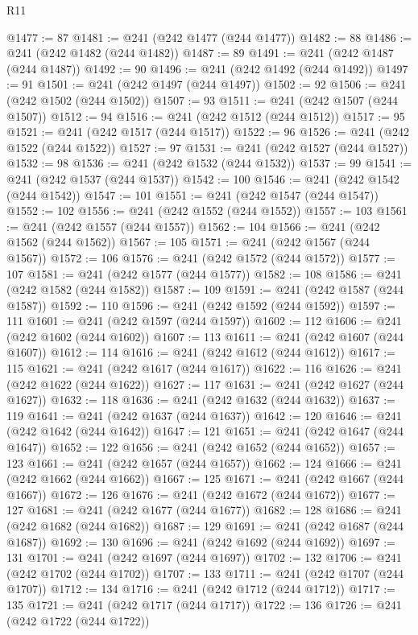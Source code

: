 \begin{lexlean}{R11}
\begin{coremodule}
{{{{{{{{{{{{{{{{{{{{{{{{{{{{{{{{{{{{{{{{{{{{{{{{{{{{{{{{{{{{{{{{{{{{{{{{{{{{{{{{{{{{{{{{{{{{{{{{{{{{{{{{{{@1477 := 87
@1481 := @241 (@242 @1477 (@244 @1477))
@1482 := 88
@1486 := @241 (@242 @1482 (@244 @1482))
@1487 := 89
@1491 := @241 (@242 @1487 (@244 @1487))
@1492 := 90
@1496 := @241 (@242 @1492 (@244 @1492))
@1497 := 91
@1501 := @241 (@242 @1497 (@244 @1497))
@1502 := 92
@1506 := @241 (@242 @1502 (@244 @1502))
@1507 := 93
@1511 := @241 (@242 @1507 (@244 @1507))
@1512 := 94
@1516 := @241 (@242 @1512 (@244 @1512))
@1517 := 95
@1521 := @241 (@242 @1517 (@244 @1517))
@1522 := 96
@1526 := @241 (@242 @1522 (@244 @1522))
@1527 := 97
@1531 := @241 (@242 @1527 (@244 @1527))
@1532 := 98
@1536 := @241 (@242 @1532 (@244 @1532))
@1537 := 99
@1541 := @241 (@242 @1537 (@244 @1537))
@1542 := 100
@1546 := @241 (@242 @1542 (@244 @1542))
@1547 := 101
@1551 := @241 (@242 @1547 (@244 @1547))
@1552 := 102
@1556 := @241 (@242 @1552 (@244 @1552))
@1557 := 103
@1561 := @241 (@242 @1557 (@244 @1557))
@1562 := 104
@1566 := @241 (@242 @1562 (@244 @1562))
@1567 := 105
@1571 := @241 (@242 @1567 (@244 @1567))
@1572 := 106
@1576 := @241 (@242 @1572 (@244 @1572))
@1577 := 107
@1581 := @241 (@242 @1577 (@244 @1577))
@1582 := 108
@1586 := @241 (@242 @1582 (@244 @1582))
@1587 := 109
@1591 := @241 (@242 @1587 (@244 @1587))
@1592 := 110
@1596 := @241 (@242 @1592 (@244 @1592))
@1597 := 111
@1601 := @241 (@242 @1597 (@244 @1597))
@1602 := 112
@1606 := @241 (@242 @1602 (@244 @1602))
@1607 := 113
@1611 := @241 (@242 @1607 (@244 @1607))
@1612 := 114
@1616 := @241 (@242 @1612 (@244 @1612))
@1617 := 115
@1621 := @241 (@242 @1617 (@244 @1617))
@1622 := 116
@1626 := @241 (@242 @1622 (@244 @1622))
@1627 := 117
@1631 := @241 (@242 @1627 (@244 @1627))
@1632 := 118
@1636 := @241 (@242 @1632 (@244 @1632))
@1637 := 119
@1641 := @241 (@242 @1637 (@244 @1637))
@1642 := 120
@1646 := @241 (@242 @1642 (@244 @1642))
@1647 := 121
@1651 := @241 (@242 @1647 (@244 @1647))
@1652 := 122
@1656 := @241 (@242 @1652 (@244 @1652))
@1657 := 123
@1661 := @241 (@242 @1657 (@244 @1657))
@1662 := 124
@1666 := @241 (@242 @1662 (@244 @1662))
@1667 := 125
@1671 := @241 (@242 @1667 (@244 @1667))
@1672 := 126
@1676 := @241 (@242 @1672 (@244 @1672))
@1677 := 127
@1681 := @241 (@242 @1677 (@244 @1677))
@1682 := 128
@1686 := @241 (@242 @1682 (@244 @1682))
@1687 := 129
@1691 := @241 (@242 @1687 (@244 @1687))
@1692 := 130
@1696 := @241 (@242 @1692 (@244 @1692))
@1697 := 131
@1701 := @241 (@242 @1697 (@244 @1697))
@1702 := 132
@1706 := @241 (@242 @1702 (@244 @1702))
@1707 := 133
@1711 := @241 (@242 @1707 (@244 @1707))
@1712 := 134
@1716 := @241 (@242 @1712 (@244 @1712))
@1717 := 135
@1721 := @241 (@242 @1717 (@244 @1717))
@1722 := 136
@1726 := @241 (@242 @1722 (@244 @1722))
}}}}}}}}}}}}}}}}}}}}}}}}}}}}}}}}}}}}}}}}}}}}}}}}}}}}}}}}}}}}}}}}}}}}}}}}}}}}}}}}}}}}}}}}}}}}}}}}}}}}}}}}}}
\end{coremodule}
\end{lexlean}
